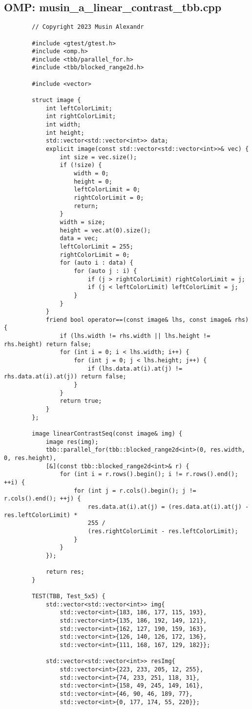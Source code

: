 \documentclass[14pt, russian]{extarticle}
\begin{document}
		\subsection{OMP: musin\_a\_linear\_contrast\_tbb.cpp}
	\begin{lstlisting}
		// Copyright 2023 Musin Alexandr
		
		#include <gtest/gtest.h>
		#include <omp.h>
		#include <tbb/parallel_for.h>
		#include <tbb/blocked_range2d.h>
		
		#include <vector>
		
		struct image {
			int leftColorLimit;
			int rightColorLimit;
			int width;
			int height;
			std::vector<std::vector<int>> data;
			explicit image(const std::vector<std::vector<int>>& vec) {
				int size = vec.size();
				if (!size) {
					width = 0;
					height = 0;
					leftColorLimit = 0;
					rightColorLimit = 0;
					return;
				}
				width = size;
				height = vec.at(0).size();
				data = vec;
				leftColorLimit = 255;
				rightColorLimit = 0;
				for (auto i : data) {
					for (auto j : i) {
						if (j > rightColorLimit) rightColorLimit = j;
						if (j < leftColorLimit) leftColorLimit = j;
					}
				}
			}
			friend bool operator==(const image& lhs, const image& rhs) {
				if (lhs.width != rhs.width || lhs.height != rhs.height) return false;
				for (int i = 0; i < lhs.width; i++) {
					for (int j = 0; j < lhs.height; j++) {
						if (lhs.data.at(i).at(j) != rhs.data.at(i).at(j)) return false;
					}
				}
				return true;
			}
		};
		
		image linearContrastSeq(const image& img) {
			image res(img);
			tbb::parallel_for(tbb::blocked_range2d<int>(0, res.width, 0, res.height),
			[&](const tbb::blocked_range2d<int>& r) {
				for (int i = r.rows().begin(); i != r.rows().end(); ++i) {
					for (int j = r.cols().begin(); j != r.cols().end(); ++j) {
						res.data.at(i).at(j) = (res.data.at(i).at(j) - res.leftColorLimit) *
						255 /
						(res.rightColorLimit - res.leftColorLimit);
					}
				}
			});
			
			return res;
		}
		
		TEST(TBB, Test_5x5) {
			std::vector<std::vector<int>> img{
				std::vector<int>{183, 186, 177, 115, 193},
				std::vector<int>{135, 186, 192, 149, 121},
				std::vector<int>{162, 127, 190, 159, 163},
				std::vector<int>{126, 140, 126, 172, 136},
				std::vector<int>{111, 168, 167, 129, 182}};
			
			std::vector<std::vector<int>> resImg{
				std::vector<int>{223, 233, 205, 12, 255},
				std::vector<int>{74, 233, 251, 118, 31},
				std::vector<int>{158, 49, 245, 149, 161},
				std::vector<int>{46, 90, 46, 189, 77},
				std::vector<int>{0, 177, 174, 55, 220}};
			

\end{lstlisting}
\end{document}
